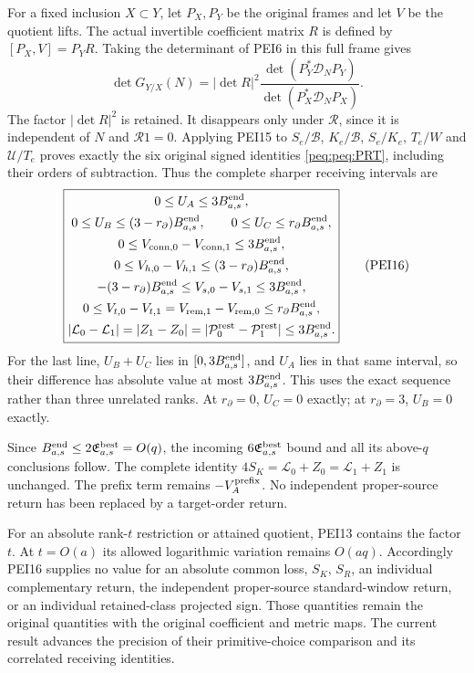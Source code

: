 \documentclass[11pt,a4paper]{article}
\begin{document}
For a fixed inclusion $X\subset Y$, let $P_X,P_Y$ be the original
frames and let $V$ be the quotient lifts. The actual invertible
coefficient matrix $R$ is defined by $[P_X,V]=P_YR$.
Taking the determinant of PEI6 in this full frame gives
\[
 \det G_{Y/X}(N)=|\det R|^2
   \frac{\det(P_Y^*\mathcal D_NP_Y)}
        {\det(P_X^*\mathcal D_NP_X)}.                            \tag{PEI15}
\]
The factor $|\det R|^2$ is retained. It disappears only under
$\mathcal R$, since it is independent of $N$ and $\mathcal R1=0$.
Applying PEI15 to $S_e/\mathscr B$, $K_e/\mathscr B$,
$S_e/K_e$, $T_e/W$ and $\mathcal U/T_e$ proves exactly the
six original signed identities \eqref{peq:peq:PRT}, including their
orders of subtraction. Thus the complete sharper receiving intervals are
\[
 \boxed{\begin{gathered}
 0\le U_A\le3B^{\rm end}_{a,s},\\
 0\le U_B\le(3-r_\partial)B^{\rm end}_{a,s},\qquad
 0\le U_C\le r_\partial B^{\rm end}_{a,s},\\
 0\le V_{{\rm conn},0}-V_{{\rm conn},1}\le3B^{\rm end}_{a,s},\\
 0\le V_{h,0}-V_{h,1}\le(3-r_\partial)B^{\rm end}_{a,s},\\
 -(3-r_\partial)B^{\rm end}_{a,s}
       \le V_{s,0}-V_{s,1}\le3B^{\rm end}_{a,s},\\
 0\le V_{t,0}-V_{t,1}
      =V_{{\rm rem},1}-V_{{\rm rem},0}
      \le r_\partial B^{\rm end}_{a,s},\\
 |\mathcal L_0-\mathcal L_1|
   =|Z_1-Z_0|
   =|\mathcal P^{\rm rest}_0-\mathcal P^{\rm rest}_1|
   \le3B^{\rm end}_{a,s}.
 \end{gathered}}                                                 \tag{PEI16}
\]
For the last line, $U_B+U_C$ lies in $[0,3B^{\rm end}_{a,s}]$,
and $U_A$ lies in that same interval, so their difference has
absolute value at most $3B^{\rm end}_{a,s}$. This uses the exact
sequence rather than three unrelated ranks. At $r_\partial=0$,
$U_C=0$ exactly; at $r_\partial=3$, $U_B=0$ exactly.

Since $B^{\rm end}_{a,s}\le2\mathfrak E^{\rm best}_{a,s}=O(q)$,
the incoming $6\mathfrak E^{\rm best}_{a,s}$ bound and all its
above-$q$ conclusions follow. The complete identity
$4S_K=\mathcal L_0+Z_0=\mathcal L_1+Z_1$ is unchanged.
The prefix term remains $-V_A^{\rm prefix}$. No independent
proper-source return has been replaced by a target-order return.

For an absolute rank-$t$ restriction or attained quotient, PEI13
contains the factor $t$. At $t=O(a)$ its allowed logarithmic
variation remains $O(aq)$. Accordingly PEI16 supplies no value
for an absolute common loss, $S_K$, $S_R$, an individual complementary
return, the independent proper-source standard-window return, or an
individual retained-class projected sign. Those quantities remain
the original quantities with the original coefficient and metric maps.
The current result advances the precision of their primitive-choice
comparison and its correlated receiving identities.
\end{document}

